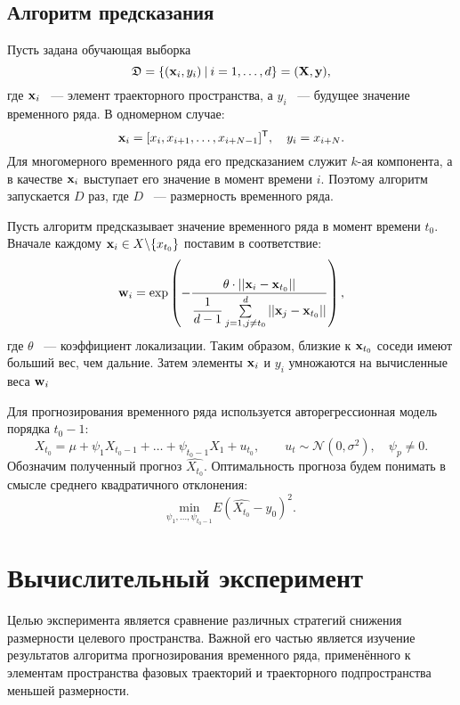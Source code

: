 \documentclass[a4paper, 12pt]{article}
\begin{document}
\subsection{Алгоритм предсказания}
Пусть задана обучающая выборка $$\mathfrak{D} = \{ (\mathbf{x}_i, y_i) \: | \: i = 1, \ldots, d \} = (\mathbf{X}, \mathbf{y}),$$ где $\mathbf{x}_i$ ~--- элемент траекторного пространства, а $y_i$ ~--- будущее значение временного ряда.
В одномерном случае: $$\mathbf{x}_i = [x_i, x_{i+1}, \ldots, x_{i+N-1}]^{\mathsf{T}}, \quad y_i = x_{i+N}.$$
Для многомерного временного ряда его предсказанием служит $k\text{-ая}$ компонента, а в качестве $\mathbf{x}_i$ выступает его значение в момент времени $i$. Поэтому алгоритм запускается $D$ раз, где $D$ ~--- размерность временного ряда.

Пусть алгоритм предсказывает значение временного ряда в момент времени $t_0$. 
Вначале каждому $\mathbf{x}_i \in X \backslash \{ x_{t_0}\}$ поставим в соответствие: $$\mathbf{w}_i = \exp \left(-\dfrac{\theta \cdot ||\mathbf{x}_i - \mathbf{x}_{t_0}||}{\dfrac{1}{d-1} \sum\limits_{j=1, j \neq t_0}^d ||\mathbf{x}_j - \mathbf{x}_{t_0}||} \right), $$ 
где $\theta$ ~--- коэффициент локализации.
Таким образом, близкие к $\mathbf{x}_{t_0}$ соседи имеют больший вес, чем дальние. Затем элементы $\mathbf{x}_i$ и $y_i$ умножаются на вычисленные веса $\mathbf{w}_i$

Для прогнозирования временного ряда используется авторегрессионная модель порядка $t_0-1$:
$$ X_{t_0} = \mu + \psi_1 X_{t_0-1} + \ldots + \psi_{t_0-1} X_1 + u_{t_0}, \qquad u_t \sim \mathcal{N}(0, \sigma^2), \quad \psi_p \neq 0.$$
Обозначим полученный прогноз $\widehat{X_{t_0}}$.
Оптимальность прогноза будем понимать в смысле среднего квадратичного отклонения:
$$ \underset{\psi_1, \ldots, \psi_{t_0-1}}{\text{min}} E(\widehat{X_{t_0}} - y_0)^2.$$


\section{Вычислительный эксперимент}
Целью эксперимента является сравнение различных стратегий снижения размерности целевого пространства. Важной его частью является изучение результатов алгоритма прогнозирования временного ряда, применённого к элементам пространства фазовых траекторий и траекторного подпространства меньшей размерности.
\end{document}
